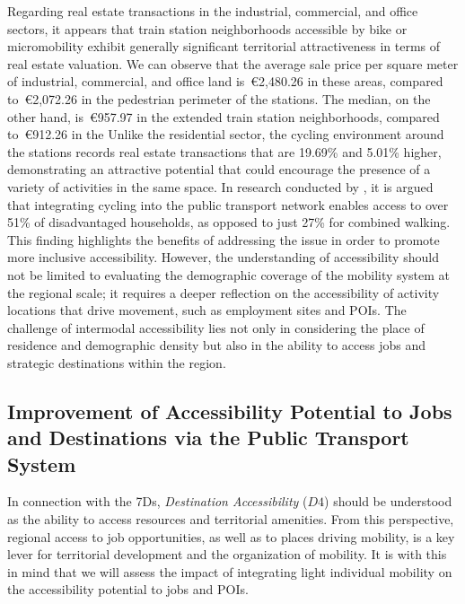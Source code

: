 \begin{refsegment}
Regarding real estate transactions in the industrial, commercial, and office sectors, it appears that train station neighborhoods accessible by bike or micromobility exhibit generally significant territorial attractiveness in terms of real estate valuation. We can observe that the average sale price per square meter of industrial, commercial, and office land is~\euro2,480.26 in these areas, compared to~\euro2,072.26 in the pedestrian perimeter of the stations. The median, on the other hand, is~\euro957.97 in the extended train station neighborhoods, compared to~\euro912.26 in the  Unlike the residential sector, the cycling environment around the stations records real estate transactions that are 19.69\% and 5.01\% higher, demonstrating an attractive potential that could encourage the presence of a variety of activities in the same space. In research conducted by \textcolor{blue}{\textcite[10]{zuo_determining_2018}}, it is argued that integrating cycling into the public transport network enables access to over 51\% of disadvantaged households, as opposed to just 27\% for combined walking. This finding highlights the benefits of addressing the  issue in order to promote more inclusive accessibility. However, the understanding of accessibility should not be limited to evaluating the demographic coverage of the mobility system at the regional scale; it requires a deeper reflection on the accessibility of activity locations that drive movement, such as employment sites and \acrshort{POIs}. The challenge of intermodal accessibility lies not only in considering the place of residence and demographic density but also in the ability to access jobs and strategic destinations within the region.%

\subsection{Improvement of Accessibility Potential to Jobs and Destinations via the Public Transport System
    \label{chap5:accessibilite-emplois}
}

In connection with the \acrfull{7Ds}, \textsl{Destination Accessibility} (\(D4\)) should be understood as the ability to access resources and territorial amenities. From this perspective, regional access to job opportunities, as well as to places driving mobility, is a key lever for territorial development and the organization of mobility. It is with this in mind that we will assess the impact of integrating light individual mobility on the accessibility potential to jobs and \acrfull{POIs}.%


\end{refsegment}

